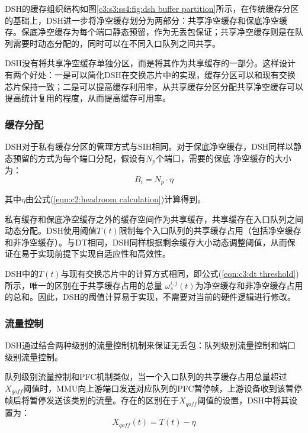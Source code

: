 DSH的缓存组织结构如图\ref{c3:s3:ss4:fig:dsh buffer partition}所示，在传统缓存分区的基础上，DSH进一步将净空缓存划分为两部分：共享净空缓存和保底净空缓存。保底净空缓存为每个端口静态预留，作为无丢包保证；共享净空缓存则是在队列需要时动态分配的，同时可以在不同入口队列之间共享。

DSH没有将共享净空缓存单独分区，而是将其作为共享缓存的一部分。这样设计有两个好处：一是可以简化DSH在交换芯片中的实现，缓存分区可以和现有交换芯片保持一致；二是可以提高缓存利用率，从共享缓存分区分配共享净空缓存可以提高统计复用的程度，从而提高缓存可用率。

\subsubsection{缓存分配}

DSH对于私有缓存分区的管理方式与SIH相同。对于保底净空缓存，DSH同样以静态预留的方式为每个端口分配，假设有$N_p$个端口，需要的保底 净空缓存的大小为：
\begin{equation}
  B_i = N_p \cdot \eta
  \label{eqn:c3:total reserved headroom in dsh}
\end{equation}

\noindent 其中$\eta$由公式(\ref{eqn:c2:headroom calculation})计算得到。

私有缓存和保底净空缓存之外的缓存空间作为共享缓存，共享缓存在入口队列之间动态分配。DSH使用阈值$T(t)$限制每个入口队列的共享缓存占用（包括净空缓存和非净空缓存）。与DT相同，DSH同样根据剩余缓存大小动态调整阈值，从而保证在易于实现前提下实现自适应性和高效性。

DSH中的$T(t)$与现有交换芯片中的计算方式相同，即公式(\ref{eqn:c3:dt threshold})所示，唯一的区别在于共享缓存占用的总量
$ω_s^{i,j}(t)$为净空缓存和非净空缓存占用的总和。因此，DSH的阈值计算易于实现，不需要对当前的硬件逻辑进行修改。

\subsubsection{流量控制}

DSH通过结合两种级别的流量控制机制来保证无丢包：队列级别流量控制和端口级别流量控制。

队列级别流量控制和PFC机制类似，当一个入口队列的共享缓存占用总量超过$X_{\mathit{qoff}}$阈值时，MMU向上游端口发送对应队列的PFC暂停帧，上游设备收到该暂停帧后将暂停发送该类别的流量。存在的区别在于$X_{\mathit{qoff}}$阈值的设置，DSH中将其设置为：
\begin{equation}
  X_{\mathit{qoff}}(t) = T(t) - \eta
  \label{eqn:c3:qoff threshold}
\end{equation}

